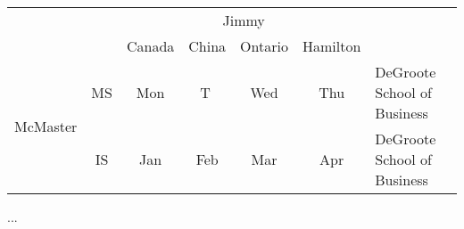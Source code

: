 
\usepackage{multirow}
	\begin{tabular}{cc|c|c|c|c|l}
		\cline{3-6}
		& & \multicolumn{4}{|c|}{Jimmy} \\ \cline{3-6}
		& & Canada & China & Ontario & Hamilton \\ \cline{1-6}
		\multicolumn{1}{|c|}{\multirow{2}{*}{McMaster}} &
		\multicolumn{1}{|c|}{MS} & Mon & T & Wed & Thu & DeGroote School of Business\\ \cline{2-6}
		\multicolumn{1}{|c|}{}                          &
		\multicolumn{1}{|c|}{IS} & Jan & Feb & Mar & Apr & DeGroote School of Business \\ \cline{1-6}
	\end{tabular}...

